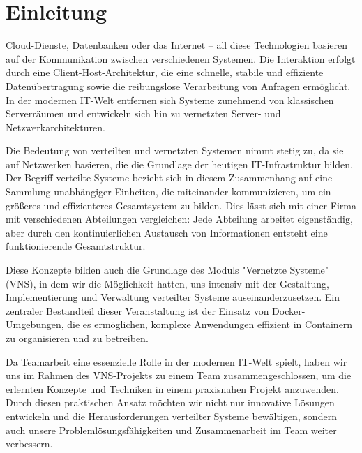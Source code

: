 \section{Einleitung}\label{einleitung}

Cloud-Dienste, Datenbanken oder das Internet – all diese Technologien basieren auf der Kommunikation zwischen verschiedenen Systemen. Die Interaktion erfolgt durch eine Client-Host-Architektur, die eine schnelle, stabile und effiziente Datenübertragung sowie die reibungslose Verarbeitung von Anfragen ermöglicht. In der modernen IT-Welt entfernen sich Systeme zunehmend von klassischen Serverräumen und entwickeln sich hin zu vernetzten Server- und Netzwerkarchitekturen. 

Die Bedeutung von verteilten und vernetzten Systemen nimmt stetig zu, da sie auf Netzwerken basieren, die die Grundlage der heutigen IT-Infrastruktur bilden. Der Begriff verteilte Systeme bezieht sich in diesem Zusammenhang auf eine Sammlung unabhängiger Einheiten, die miteinander kommunizieren, um ein größeres und effizienteres Gesamtsystem zu bilden. Dies lässt sich mit einer Firma mit verschiedenen Abteilungen vergleichen: Jede Abteilung arbeitet eigenständig, aber durch den kontinuierlichen Austausch von Informationen entsteht eine funktionierende Gesamtstruktur. 

Diese Konzepte bilden auch die Grundlage des Moduls "Vernetzte Systeme" (VNS), in dem wir die Möglichkeit hatten, uns intensiv mit der Gestaltung, Implementierung und Verwaltung verteilter Systeme auseinanderzusetzen. Ein zentraler Bestandteil dieser Veranstaltung ist der Einsatz von Docker-Umgebungen, die es ermöglichen, komplexe Anwendungen effizient in Containern zu organisieren und zu betreiben. 

Da Teamarbeit eine essenzielle Rolle in der modernen IT-Welt spielt, haben wir uns im Rahmen des VNS-Projekts zu einem Team zusammengeschlossen, um die erlernten Konzepte und Techniken in einem praxisnahen Projekt anzuwenden. Durch diesen praktischen Ansatz möchten wir nicht nur innovative Lösungen entwickeln und die Herausforderungen verteilter Systeme bewältigen, sondern auch unsere Problemlösungsfähigkeiten und Zusammenarbeit im Team weiter verbessern.

